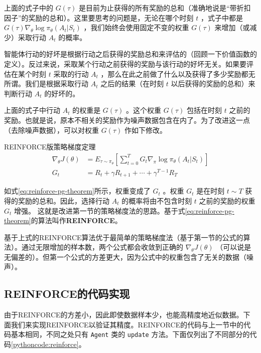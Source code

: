 \documentclass[lang=cn,newtx,10pt,scheme=chinese]{elegantbook}
\newcommand{\py}[1]{%
  \colorbox{gray!10}{\texttt{#1}}%
}
\begin{document}
上面的式子中的 $G(\tau)$ 是目前为止获得的所有奖励的总和（准确地说是``带折扣因子''的奖励的总和）。这里要思考的问题是，无论在哪个时刻 $t$ ，式子中都是 $G(\tau)\nabla_{\theta}\log\pi_{\theta}(A_t|S_t)$ ，我们始终会使用固定不变的权重 $G(\tau)$ 来增加（或减少）采取行动 $A_t$ 的概率。

智能体行动的好坏是根据行动之后获得的奖励总和来评估的（回顾一下价值函数的定义）。反过来说，采取某个行动之前获得的奖励与该行动的好坏无关。如果要评估在某个时刻 $t$ 采取的行动 $A_t$ ，那么在此之前做了什么以及获得了多少奖励都无所谓。我们是根据采取行动 $A_t$ 之后的结果（在时刻 $t$ 以后获得的奖励的总和）来判断行动 $A_t$ 的好坏的。

上面的式子中行动 $A_t$ 的权重是 $G(\tau)$ 。这个权重 $G(\tau)$ 包括在时刻 $t$ 之前的奖励。也就是说，原本不相关的奖励作为噪声数据包含在内了。为了改进这一点（去除噪声数据），可以对权重 $G(\tau)$ 作如下修改。

\begin{theorem}{REINFORCE版策略梯度定理}{}
\begin{equation}\label{eq:reinforce-pg-theorem}
\begin{aligned}
\nabla_{\theta}J(\theta) &= E_{\tau\sim\pi_{\theta}}[\sum_{t=0}^TG_t\nabla_{\pi}\log\pi_{\theta}(A_t|S_t)] \\
G_t &= R_t + \gamma R_{t+1} + \cdots + \gamma^{T-1}R_T
\end{aligned}
\end{equation}
\end{theorem}

如式\ref{eq:reinforce-pg-theorem}所示，权重变成了 $G_t$ 。权重 $G_t$ 是在时刻 $t\sim T$ 获得的奖励的总和。因此，选择行动 $A_t$ 的概率将由不包含时刻 $t$ 之前的奖励的权重 $G_t$ 增强。 这就是改进第一节的策略梯度法的思路。基于式\ref{eq:reinforce-pg-theorem}的算法叫作\textbf{REINFORCE}。

\begin{marker}
基于上式的REINFORCE算法优于最简单的策略梯度法（基于第一节的公式的算法）。通过无限增加的样本数，两个公式都会收敛到正确的 $\nabla_{\theta}J(\theta)$ （可以说是无偏差的）。但第一个公式的方差更大，因为公式中的权重包含了无关的数据（噪声）。
\end{marker}

\subsection{REINFORCE的代码实现}

由于REINFORCE的方差小，因此即使数据样本少，也能高精度地近似数据。下面我们来实现REINFORCE以验证其精度。REINFORCE的代码与上一节中的代码基本相同，不同之处只有 \py{Agent} 类的 \py{update} 方法。下面仅列出了不同部分的代码\ref{pythoncode:reinforce}。
\end{document}
